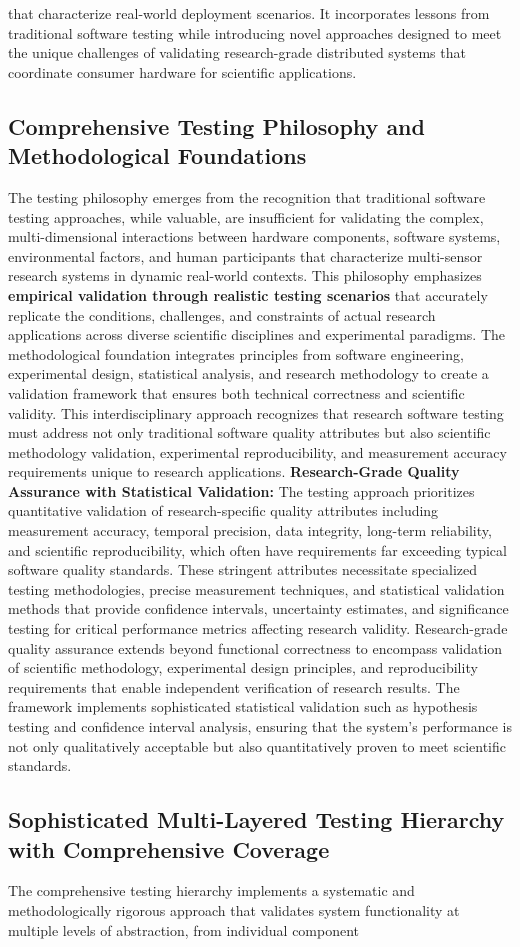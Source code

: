 that characterize real-world deployment scenarios. It incorporates lessons from traditional software testing while introducing novel approaches designed to meet the unique challenges of validating research-grade distributed systems that coordinate consumer hardware for scientific applications. \subsection{Comprehensive Testing Philosophy and Methodological Foundations} The testing philosophy emerges from the recognition that traditional software testing approaches, while valuable, are insufficient for validating the complex, multi-dimensional interactions between hardware components, software systems, environmental factors, and human participants that characterize multi-sensor research systems in dynamic real-world contexts. This philosophy emphasizes \textbf{empirical validation through realistic testing scenarios} that accurately replicate the conditions, challenges, and constraints of actual research applications across diverse scientific disciplines and experimental paradigms. The methodological foundation integrates principles from software engineering, experimental design, statistical analysis, and research methodology to create a validation framework that ensures both technical correctness and scientific validity. This interdisciplinary approach recognizes that research software testing must address not only traditional software quality attributes but also scientific methodology validation, experimental reproducibility, and measurement accuracy requirements unique to research applications. \textbf{Research-Grade Quality Assurance with Statistical Validation:} The testing approach prioritizes quantitative validation of research-specific quality attributes including measurement accuracy, temporal precision, data integrity, long-term reliability, and scientific reproducibility, which often have requirements far exceeding typical software quality standards. These stringent attributes necessitate specialized testing methodologies, precise measurement techniques, and statistical validation methods that provide confidence intervals, uncertainty estimates, and significance testing for critical performance metrics affecting research validity. Research-grade quality assurance extends beyond functional correctness to encompass validation of scientific methodology, experimental design principles, and reproducibility requirements that enable independent verification of research results. The framework implements sophisticated statistical validation such as hypothesis testing and confidence interval analysis, ensuring that the system's performance is not only qualitatively acceptable but also quantitatively proven to meet scientific standards. \subsection{Sophisticated Multi-Layered Testing Hierarchy with Comprehensive Coverage} The comprehensive testing hierarchy implements a systematic and methodologically rigorous approach that validates system functionality at multiple levels of abstraction, from individual component 